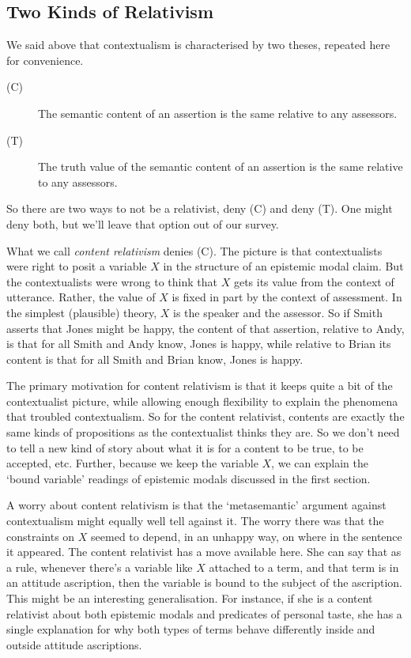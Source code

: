 \subsection{Two Kinds of Relativism}
We said above that contextualism is characterised by two theses, repeated here for convenience.


\begin{description}
\item[(C)] The semantic content of an assertion is the same relative to any assessors.
\item[(T)] The truth value of the semantic content of an assertion is the same relative to any assessors.
\end{description}

So there are two ways to not be a relativist, deny (C) and deny (T). One might deny both, but we'll leave that option out of our survey.

What we call \textit{content relativism} denies (C). The picture is that contextualists were right to posit a variable $X$ in the structure of an epistemic modal claim. But the contextualists were wrong to think that $X$ gets its value from the context of utterance. Rather, the value of $X$ is fixed in part by the context of assessment. In the simplest (plausible) theory, $X$ is the speaker and the assessor. So if Smith asserts that Jones might be happy, the content of that assertion, relative to Andy, is that for all Smith and Andy know, Jones is happy, while relative to Brian its content is that for all Smith and Brian know, Jones is happy.

The primary motivation for content relativism is that it keeps quite a bit of the contextualist picture, while allowing enough flexibility to explain the phenomena that troubled contextualism. So for the content relativist, contents are exactly the same kinds of propositions as the contextualist thinks they are. So we don't need to tell a new kind of story about what it is for a content to be true, to be accepted, etc. Further, because we keep the variable $X$, we can explain the `bound variable' readings of epistemic modals discussed in the first section.

A worry about content relativism is that the `metasemantic' argument against contextualism might equally well tell against it. The worry there was that the constraints on $X$ seemed to depend, in an unhappy way, on where in the sentence it appeared. The content relativist has a move available here. She can say that as a rule, whenever there's a variable like $X$ attached to a term, and that term is in an attitude ascription, then the variable is bound to the subject of the ascription. This might be an interesting generalisation. For instance, if she is a content relativist about both epistemic modals and predicates of personal taste, she has a single explanation for why both types of terms behave differently inside and outside attitude ascriptions.

